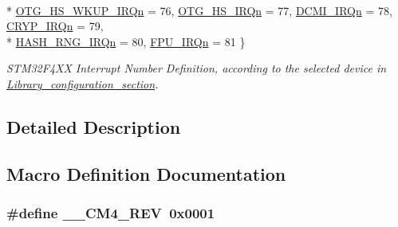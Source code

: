 \begin{DoxyCompactItemize}
\\*
\hyperlink{group___configuration__section__for___c_m_s_i_s_gga666eb0caeb12ec0e281415592ae89083a9e5c9d81dd3985a88094f8158c0f0267}{O\+T\+G\+\_\+\+H\+S\+\_\+\+W\+K\+U\+P\+\_\+\+I\+R\+Qn} = 76, 
\hyperlink{group___configuration__section__for___c_m_s_i_s_gga666eb0caeb12ec0e281415592ae89083aad2d5e47d27fe3a02f7059b20bb729c0}{O\+T\+G\+\_\+\+H\+S\+\_\+\+I\+R\+Qn} = 77, 
\hyperlink{group___configuration__section__for___c_m_s_i_s_gga666eb0caeb12ec0e281415592ae89083ace3c0fc2c4d05a7c02e3c987da5bc8e8}{D\+C\+M\+I\+\_\+\+I\+R\+Qn} = 78, 
\hyperlink{group___configuration__section__for___c_m_s_i_s_gga666eb0caeb12ec0e281415592ae89083a70c9645bf48ca539510cc8f7d974f017}{C\+R\+Y\+P\+\_\+\+I\+R\+Qn} = 79, 
\\*
\hyperlink{group___configuration__section__for___c_m_s_i_s_gga666eb0caeb12ec0e281415592ae89083a86a161642b54055f9bbea3937e6352de}{H\+A\+S\+H\+\_\+\+R\+N\+G\+\_\+\+I\+R\+Qn} = 80, 
\hyperlink{group___configuration__section__for___c_m_s_i_s_gga666eb0caeb12ec0e281415592ae89083aa6b8ff01b016a798c6e639728c179e4f}{F\+P\+U\+\_\+\+I\+R\+Qn} = 81
 \}\begin{DoxyCompactList}\small\item\em S\+T\+M32\+F4\+XX Interrupt Number Definition, according to the selected device in \hyperlink{group___library__configuration__section}{Library\+\_\+configuration\+\_\+section}. \end{DoxyCompactList}
\end{DoxyCompactItemize}


\subsection{Detailed Description}


\subsection{Macro Definition Documentation}
\subsubsection[{\texorpdfstring{\+\_\+\+\_\+\+C\+M4\+\_\+\+R\+EV}{__CM4_REV}}]{\setlength{\rightskip}{0pt plus 5cm}\#define \+\_\+\+\_\+\+C\+M4\+\_\+\+R\+EV~0x0001}\hypertarget{group___configuration__section__for___c_m_s_i_s_ga45a97e4bb8b6ce7c334acc5f45ace3ba}{}\label{group___configuration__section__for___c_m_s_i_s_ga45a97e4bb8b6ce7c334acc5f45ace3ba}


